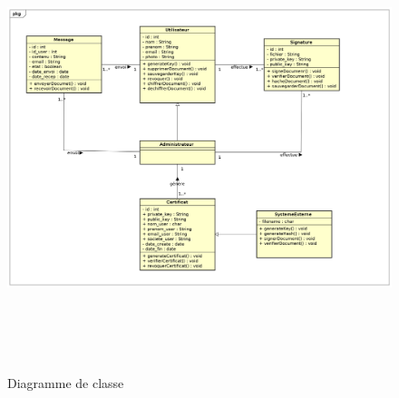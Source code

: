 			 	
			\begin{figure}[H]
					\centering
					\includegraphics[width=18cm, height=13cm]{../Diagrammes/DigrammeClass/ClassDiagram.png}
					\caption{Diagramme de classe}
					\label{diaclass}
			\end{figure}	
			
			
